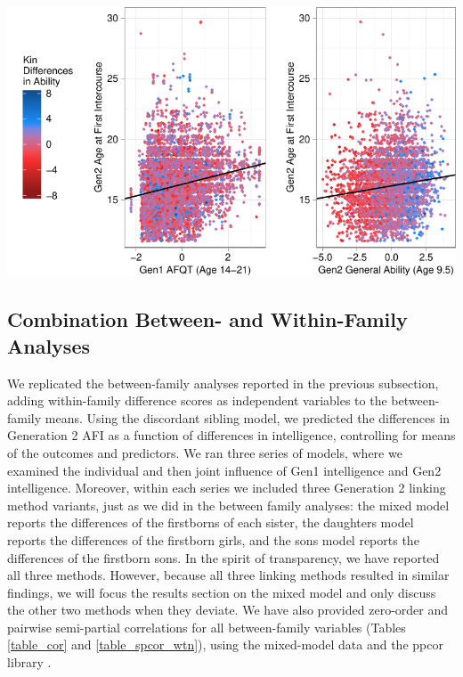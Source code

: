 \documentclass[a4paper,man,apacite,natbib,12pt,longtable]{apa6}\usepackage[]{graphicx}\usepackage[]{color}
\newenvironment{knitrout}{}{} %
\begin{document}
\begin{landscape}
\noindent\begin{minipage}{\paperwidth}
\label{plot_gen2_afi}
\begin{center}
\begin{knitrout}
\color{fgcolor}
\includegraphics[width=1\paperwidth]{figure/plot_gen2_afi-1} 

\end{knitrout}
\end{center}
\end{minipage}
\end{landscape}

%
\subsection{Combination Between- and Within-Family Analyses}
We replicated the between-family analyses reported in the previous subsection, adding within-family difference scores as independent variables to the between-family means. Using the discordant sibling model, we predicted the differences in Generation 2 AFI as a function of differences in intelligence, controlling for means of the outcomes and predictors. We ran three series of models, where we examined the individual and then joint influence of Gen1 intelligence and Gen2 intelligence. Moreover, within each series we included three Generation 2 linking method variants, just as we did in the between family analyses: the mixed model reports the differences of the firstborns of each sister, the daughters model reports the differences of the firstborn girls, and the sons model reports the differences of the firstborn sons. In the spirit of transparency, we have reported all three methods. However, because all three linking methods resulted in similar findings, we will focus the results section on the mixed model and only discuss the other two methods when they deviate. We have also provided zero-order and pairwise semi-partial correlations for all between-family variables (Tables \ref{table_cor} and \ref{table_spcor_wtn}), using the mixed-model data and the ppcor \R library \citep{kim2015ppcor}.
\end{document}
